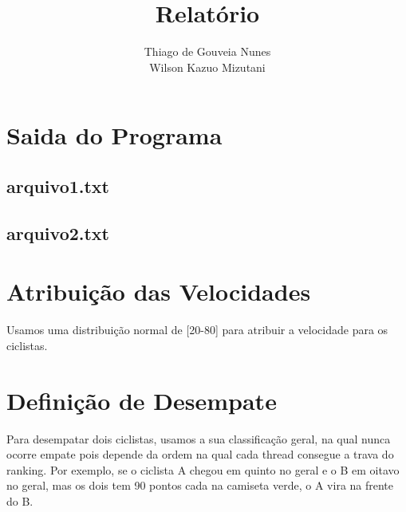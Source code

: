 \documentclass[a4paper,11pt]{article}
\title{Relatório}
\author{Thiago de Gouveia Nunes \\ Wilson Kazuo Mizutani}
\begin{document}
\maketitle
\tableofcontents

\section{Saida do Programa}
\subsection{arquivo1.txt}
\subsection{arquivo2.txt}
\section{Atribuição das Velocidades}
  Usamos uma distribuição normal de [20-80] para atribuir a velocidade para os ciclistas.
\section{Definição de Desempate}
  Para desempatar dois ciclistas, usamos a sua classificação geral, na qual nunca ocorre empate pois depende da ordem na qual cada thread
consegue a trava do ranking. Por exemplo, se o ciclista A chegou em quinto no geral e o B em oitavo no geral, mas os dois tem 90 pontos
cada na camiseta verde, o A vira na frente do B.
\end{document}
